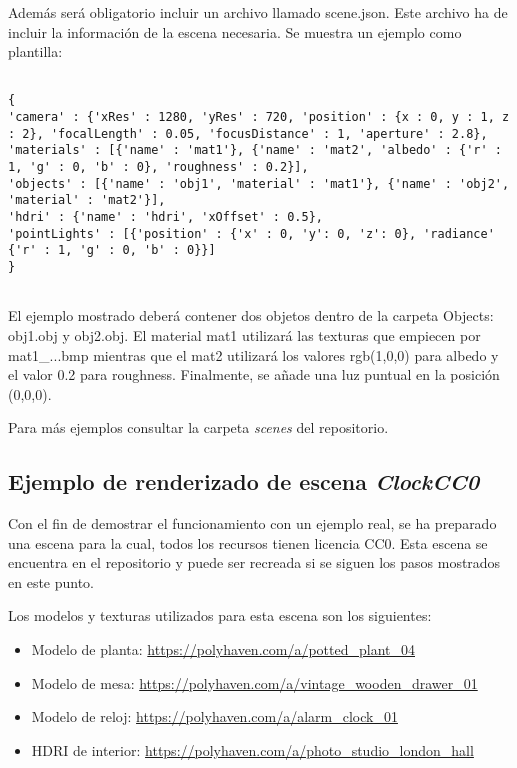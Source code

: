 Además será obligatorio incluir un archivo llamado scene.json. Este archivo ha de incluir la información de la escena necesaria. Se muestra un ejemplo como plantilla:

\begin{minipage}[c]{0.95\textwidth}
\begin{lstlisting}
	
{	
'camera' : {'xRes' : 1280, 'yRes' : 720, 'position' : {x : 0, y : 1, z : 2}, 'focalLength' : 0.05, 'focusDistance' : 1, 'aperture' : 2.8},
'materials' : [{'name' : 'mat1'}, {'name' : 'mat2', 'albedo' : {'r' : 1, 'g' : 0, 'b' : 0}, 'roughness' : 0.2}],
'objects' : [{'name' : 'obj1', 'material' : 'mat1'}, {'name' : 'obj2', 'material' : 'mat2'}],
'hdri' : {'name' : 'hdri', 'xOffset' : 0.5},
'pointLights' : [{'position' : {'x' : 0, 'y': 0, 'z': 0}, 'radiance' {'r' : 1, 'g' : 0, 'b' : 0}}]
}
	
\end{lstlisting}
\end{minipage}

El ejemplo mostrado deberá contener dos objetos dentro de la carpeta Objects: obj1.obj y obj2.obj. El material mat1 utilizará las texturas que empiecen por mat1\_...bmp mientras que el mat2 utilizará los valores rgb(1,0,0) para albedo y el valor 0.2 para roughness. Finalmente, se añade una luz puntual en la posición (0,0,0).

Para más ejemplos consultar la carpeta \emph{scenes} del repositorio.

\subsection{Ejemplo de renderizado de escena \emph{ClockCC0}}

Con el fin de demostrar el funcionamiento con un ejemplo real, se ha preparado una escena para la cual, todos los recursos tienen licencia CC0. Esta escena se encuentra en el repositorio y puede ser recreada si se siguen los pasos mostrados en este punto.

Los modelos y texturas utilizados para esta escena son los siguientes:

\begin{itemize}
	\item Modelo de planta: \url{https://polyhaven.com/a/potted_plant_04}
	\item Modelo de mesa: \url{https://polyhaven.com/a/vintage_wooden_drawer_01}
	\item Modelo de reloj: \url{https://polyhaven.com/a/alarm_clock_01}
	\item HDRI de interior: \url{https://polyhaven.com/a/photo_studio_london_hall}
\end{itemize}

